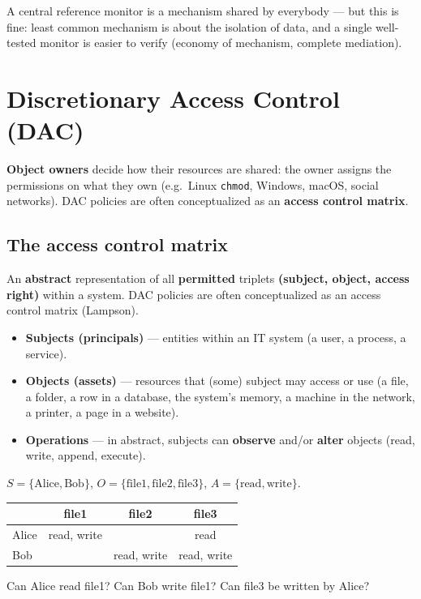 \begin{rembox}[title=Least common mechanism?]
A central reference monitor is a mechanism shared by everybody --- but this is fine: least
common mechanism is about the isolation of data, and a single well-tested monitor is
easier to verify (economy of mechanism, complete mediation).
\end{rembox}

\section{Discretionary Access Control (DAC)}

\begin{defnbox}[title=Discretionary Access Control (DAC)]
\textbf{Object owners} decide how their resources are shared: the owner assigns the
permissions on what they own (e.g.\ Linux \texttt{chmod}, Windows, macOS, social
networks). DAC policies are often conceptualized as an \textbf{access control matrix}.
\end{defnbox}

\subsection{The access control matrix}

\begin{defnbox}[title=Access control matrix]
An \textbf{abstract} representation of all \textbf{permitted} triplets
\textbf{(subject, object, access right)} within a system. DAC policies are often
conceptualized as an access control matrix (Lampson).
\begin{itemize}
  \item \textbf{Subjects (principals)} --- entities within an IT system (a user, a
        process, a service).
  \item \textbf{Objects (assets)} --- resources that (some) subject may access or use
        (a file, a folder, a row in a database, the system's memory, a machine in the
        network, a printer, a page in a website).
  \item \textbf{Operations} --- in abstract, subjects can \textbf{observe} and/or
        \textbf{alter} objects (read, write, append, execute).
\end{itemize}
\end{defnbox}

\begin{exbox}[title=Access control matrix]
$S = \{\text{Alice}, \text{Bob}\}$, $O = \{\text{file1}, \text{file2},
\text{file3}\}$, $A = \{\text{read}, \text{write}\}$.
\begin{center}
\begin{tabular}{l|c|c|c}
      & file1      & file2      & file3      \\ \hline
Alice & read, write &            & read       \\
Bob   &            & read, write & read, write
\end{tabular}
\end{center}
Can Alice read file1? Can Bob write file1? Can file3 be written by Alice?
\end{exbox}

